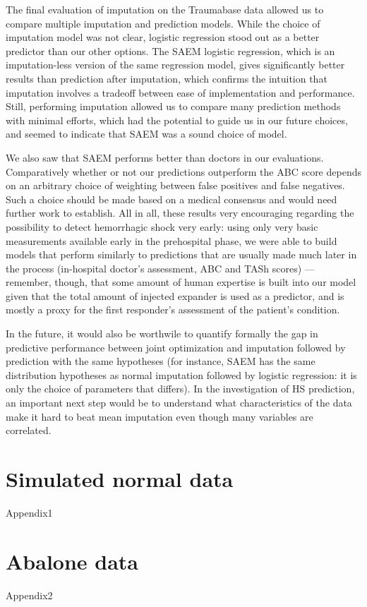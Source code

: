 \documentclass[12pt, a4paper]{memoir}
\begin{document}
The final evaluation of imputation on the Traumabase data allowed us to compare multiple imputation and prediction models. While the choice of imputation model was not clear, logistic regression stood out as a better predictor than our other options. The SAEM logistic regression, which is an imputation-less version of the same regression model, gives significantly better results than prediction after imputation, which confirms the intuition that imputation involves a tradeoff between ease of implementation and performance. Still, performing imputation allowed us to compare many prediction methods with minimal efforts, which had the potential to guide us in our future choices, and seemed to indicate that SAEM was a sound choice of model.

We also saw that SAEM performs better than doctors in our evaluations. Comparatively whether or not our predictions outperform the ABC score depends on an arbitrary choice of weighting between false positives and false negatives. Such a choice should be made based on a medical consensus and would need further work to establish. All in all, these results very encouraging regarding the possibility to detect hemorrhagic shock very early: using only very basic measurements available early in the prehospital phase, we were able to build models that perform similarly to predictions that are usually made much later in the process (in-hospital doctor's assessment, ABC and TASh scores) --- remember, though, that some amount of human expertise is built into our model given that the total amount of injected expander is used as a predictor, and is mostly a proxy for the first responder's assessment of the patient's condition. 

In the future, it would also be worthwile to quantify formally the gap in predictive performance between joint optimization and imputation followed by prediction with the same hypotheses (for instance, SAEM has the same distribution hypotheses as normal imputation followed by logistic regression: it is only the choice of parameters that differs). In the investigation of HS prediction, an important next step would be to understand what characteristics of the data make it hard to beat mean imputation even though many variables are correlated.
\begin{appendices}
\chapter{Simulated normal data}
\label{simulation}
{Appendix1}

\chapter{Abalone data}
\label{abalone}
{Appendix2}
\end{appendices}


\end{document}
